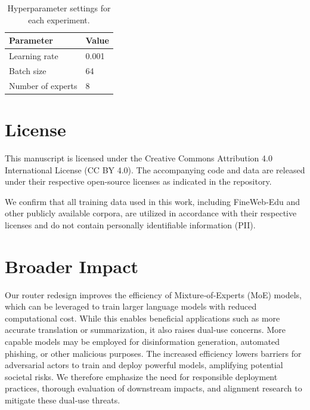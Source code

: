 \documentclass[11pt]{article}
\begin{document}
\begin{table}[h]
\centering
\caption{Hyperparameter settings for each experiment.}
\label{tab:hyperparams}
\begin{tabular}{l l}
\toprule
Parameter & Value \\
\midrule
Learning rate & 0.001 \\
Batch size & 64 \\
Number of experts & 8 \\
\bottomrule
\end{tabular}
\end{table}

\section*{License}
This manuscript is licensed under the Creative Commons Attribution 4.0 International License (CC BY 4.0). The accompanying code and data are released under their respective open-source licenses as indicated in the repository.

We confirm that all training data used in this work, including FineWeb‑Edu and other publicly available corpora, are utilized in accordance with their respective licenses and do not contain personally identifiable information (PII).
\section{Broader Impact}
\label{sec:broader-impact}
Our router redesign improves the efficiency of Mixture‑of‑Experts (MoE) models, which can be leveraged to train larger language models with reduced computational cost. While this enables beneficial applications such as more accurate translation or summarization, it also raises dual‑use concerns. More capable models may be employed for disinformation generation, automated phishing, or other malicious purposes. The increased efficiency lowers barriers for adversarial actors to train and deploy powerful models, amplifying potential societal risks. We therefore emphasize the need for responsible deployment practices, thorough evaluation of downstream impacts, and alignment research to mitigate these dual‑use threats.
\end{document}
